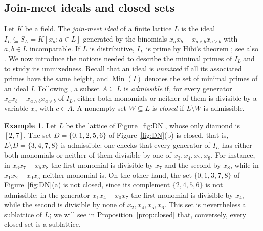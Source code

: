 \documentclass{amsart}
\theoremstyle{definition}
\newtheorem{example}[theorem]{Example}
\DeclareMathOperator{\Min}{Min}
\begin{document}
\subsection{Join-meet ideals and closed sets}\label{subsec:closed}
Let $K$ be a field. The \emph{join-meet ideal} of a finite lattice $L$ is the ideal $I_L\subseteq S_L=K[x_a:a\in L]$ generated by the binomials $x_ax_b-x_{a\wedge b}x_{a\vee b}$ with $a,b\in L$ incomparable. If $L$ is distributive, $I_L$ is prime by Hibi's theorem \cite{H}; see also \cite[Theorem 6.21]{HHO}. We now introduce the notions needed to describe the minimal primes of $I_L$ and to study its unmixedness. Recall that an ideal is \emph{unmixed} if all its associated primes have the same height, and $\Min(I)$ denotes the set of minimal primes of an ideal $I$. Following \cite[Definition 2.2]{EH}, a subset $A\subseteq L$ is \emph{admissible} if, for every generator $x_ax_b-x_{a\wedge b}x_{a\vee b}$ of $I_L$, either both monomials or neither of them is divisible by a variable $x_c$ with $c\in A$. A nonempty set $W\subseteq L$ is \emph{closed} if $L\setminus W$ is admissible. 

\begin{example}\label{ex:closed}
	Let $L$ be the lattice of Figure~\ref{fig:DN}, whose only diamond is $[2,7]$. The set $D=\{0,1,2,5,6\}$ of Figure~\ref{fig:DN}(b) is closed, that is, $L\setminus D=\{3,4,7,8\}$ is admissible: one checks that every generator of $I_L$ has either both monomials or neither of them divisible by one of $x_3,x_4,x_7,x_8$. For instance, in $x_6x_7-x_5x_8$ the first monomial is divisible by $x_7$ and the second by $x_8$, while in $x_1x_2-x_0x_5$ neither monomial is. On the other hand, the set $\{0,1,3,7,8\}$ of Figure~\ref{fig:DN}(a) is not closed, since its complement $\{2,4,5,6\}$ is not admissible: in the generator $x_1x_4-x_0x_7$ the first monomial is divisible by $x_4$, while the second is divisible by none of $x_2,x_4,x_5,x_6$. This set is nevertheless a sublattice of $L$; we will see in Proposition~\ref{prop:closed} that, conversely, every closed set is a sublattice.
\end{example}
\end{document}
